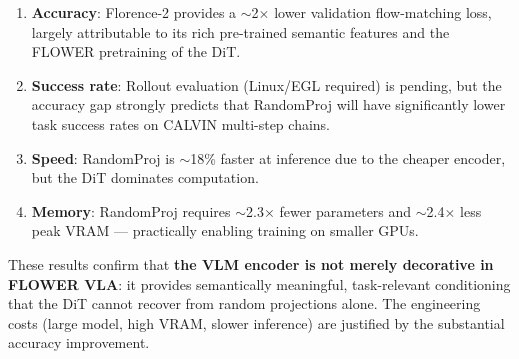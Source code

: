 \documentclass[11pt,a4paper]{article}
\begin{document}
\begin{enumerate}
  \item \textbf{Accuracy}: Florence-2 provides a $\sim$2$\times$ lower
        validation flow-matching loss, largely attributable to its rich
        pre-trained semantic features and the FLOWER pretraining of the DiT.
  \item \textbf{Success rate}: Rollout evaluation (Linux/EGL required) is
        pending, but the accuracy gap strongly predicts that RandomProj will
        have significantly lower task success rates on CALVIN multi-step chains.
  \item \textbf{Speed}: RandomProj is $\sim$18\% faster at inference due to
        the cheaper encoder, but the DiT dominates computation.
  \item \textbf{Memory}: RandomProj requires $\sim$2.3$\times$ fewer parameters
        and $\sim$2.4$\times$ less peak VRAM — practically enabling training on
        smaller GPUs.
\end{enumerate}

These results confirm that \textbf{the VLM encoder is not merely decorative in
FLOWER VLA}: it provides semantically meaningful, task-relevant conditioning
that the DiT cannot recover from random projections alone.  The engineering
costs (large model, high VRAM, slower inference) are justified by the
substantial accuracy improvement.



\end{document}
